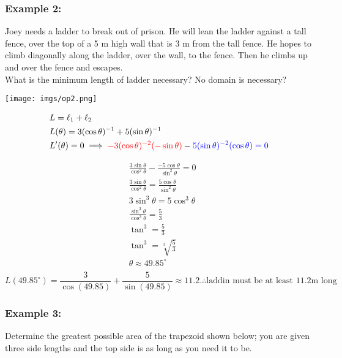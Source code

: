 \documentclass{article}
\begin{document}
\subsubsection*{Example 2:}
Joey needs a ladder to break out of prison. He will lean the ladder against a tall fence, over the top of a 5 m high wall that is 3 m from the tall fence. He hopes to climb diagonally along the ladder, over the wall, to the fence. Then he climbs up and over the fence and escapes.\\
What is the minimum length of ladder necessary? No domain is necessary? 


\begin{minipage}{0.5\textwidth}
  \centering
  \texttt{[image: imgs/op2.png]}
\end{minipage}%
\begin{minipage}{0.5\textwidth}
    \begin{align*}
        &L=\ell_1+\ell_2\\
        &L(\theta)=3(\cos\theta)^{-1}+5(\sin \theta)^{-1}\\
        &L'(\theta)=0 \implies \textcolor{red}{-3(\cos\theta)^{-2}(-\sin\theta)}-\textcolor{blue}{5(\sin \theta)^{-2}(\cos \theta)=0}
    \end{align*}
\end{minipage}
\begin{align*}
    &\frac{3\sin\theta}{\cos^2\theta}-\frac{-5\cos \theta}{\sin^2\theta}=0\\
    &\frac{3\sin \theta}{\cos^2\theta}=\frac{5\cos \theta}{\sin^2\theta}\\
    &3\sin^3\theta=5\cos^3\theta\\
    &\frac{\sin^3\theta}{\cos^3\theta}=\frac{5}{3}\\
    &\tan^3=\frac{5}{3}\\
    &\tan^3=\sqrt[3]{\frac{5}{3}}\\
    &\theta \approx49.85^{\circ}\\
\end{align*}
$$L(49.85^{\circ})=\frac{3}{\cos(49.85)}+\frac{5}{\sin(49.85)}\approx 11.2. \therefore \text{laddin must be at least 11.2m long} $$
\newpage 

\subsubsection*{Example 3: }
Determine the greatest possible area of the trapezoid shown below; you are given three side lengths and the top side is as long as you need it to be.
\end{document}

